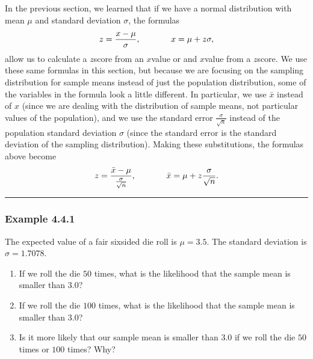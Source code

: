\documentclass[letterpaper,10pt,english]{jupyterBook}
\begin{document}
\sphinxAtStartPar
In the previous section, we learned that if we have a normal distribution with mean \(\mu\) and standard deviation \(\sigma\), the formulas
\begin{equation*}
\begin{split} z = \frac{x - \mu}{\sigma}, \hspace{0.5in} x = \mu + z\sigma,\end{split}
\end{equation*}
\sphinxAtStartPar
allow us to calculate a \(z\)\sphinxhyphen{}score from an \(x\)\sphinxhyphen{}value or and \(x\)\sphinxhyphen{}value from a \(z\)\sphinxhyphen{}score. We use these same formulas in this section, but because we are focusing on the sampling distribution for sample means instead of just the population distribution, some of the variables in the formula look a little different. In particular, we use \(\bar{x}\) instead of \(x\) (since we are dealing with the distribution of sample means, not particular values of the population), and we use the standard error \(\frac{\sigma}{\sqrt{n}}\) instead of the population standard deviation \(\sigma\) (since the standard error is the standard deviation of the sampling distribution). Making these substitutions, the formulas above become
\begin{equation*}
\begin{split} z = \frac{\bar{x} - \mu}{\frac{\sigma}{\sqrt{n}}}, \hspace{0.5in} \bar{x} = \mu + z\frac{\sigma}{\sqrt{n}}. \end{split}
\end{equation*}

\bigskip\hrule\bigskip



\subsubsection{Example 4.4.1}
\label{\detokenize{Ch4 The Normal Distribution and the Central Limit Theorem/4.4 The Central Limit Theorem for Means:example-4-4-1}}
\sphinxAtStartPar
The expected value of a fair six\sphinxhyphen{}sided die roll is \(\mu = 3.5\). The standard deviation is \(\sigma = 1.7078\).
\begin{enumerate}
%
\item {} 
\sphinxAtStartPar
If we roll the die \(50\) times, what is the likelihood that the sample mean is smaller than \(3.0\)?

\item {} 
\sphinxAtStartPar
If we roll the die \(100\) times, what is the likelihood that the sample mean is smaller than \(3.0\)?

\item {} 
\sphinxAtStartPar
Is it more likely that our sample mean is smaller than \(3.0\) if we roll the die \(50\) times or \(100\) times? Why?

\end{enumerate}
\end{document}
